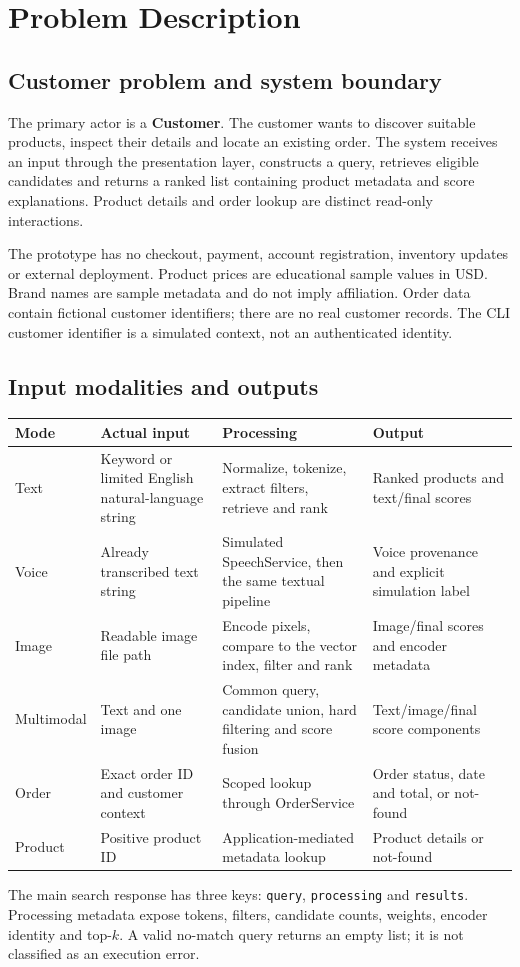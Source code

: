 \documentclass[11pt,a4paper]{article}
\begin{document}
\section{Problem Description}\label{sec:problem}
\subsection{Customer problem and system boundary}
The primary actor is a \textbf{Customer}. The customer wants to discover suitable products, inspect their details and locate an existing order. The system receives an input through the presentation layer, constructs a query, retrieves eligible candidates and returns a ranked list containing product metadata and score explanations. Product details and order lookup are distinct read-only interactions.

The prototype has no checkout, payment, account registration, inventory updates or external deployment. Product prices are educational sample values in USD. Brand names are sample metadata and do not imply affiliation. Order data contain fictional customer identifiers; there are no real customer records. The CLI customer identifier is a simulated context, not an authenticated identity.

\subsection{Input modalities and outputs}
\begin{longtable}{@{}P{1.9cm}P{4.0cm}P{5.3cm}P{4.2cm}@{}}
\toprule\textbf{Mode}&\textbf{Actual input}&\textbf{Processing}&\textbf{Output}\\\midrule\endhead
Text&Keyword or limited English natural-language string&Normalize, tokenize, extract filters, retrieve and rank&Ranked products and text/final scores\\
Voice&Already transcribed text string&Simulated SpeechService, then the same textual pipeline&Voice provenance and explicit simulation label\\
Image&Readable image file path&Encode pixels, compare to the vector index, filter and rank&Image/final scores and encoder metadata\\
Multimodal&Text and one image&Common query, candidate union, hard filtering and score fusion&Text/image/final score components\\
Order&Exact order ID and customer context&Scoped lookup through OrderService&Order status, date and total, or not-found\\
Product&Positive product ID&Application-mediated metadata lookup&Product details or not-found\\\bottomrule
\end{longtable}
The main search response has three keys: \texttt{query}, \texttt{processing} and \texttt{results}. Processing metadata expose tokens, filters, candidate counts, weights, encoder identity and top-$k$. A valid no-match query returns an empty list; it is not classified as an execution error.
\end{document}

